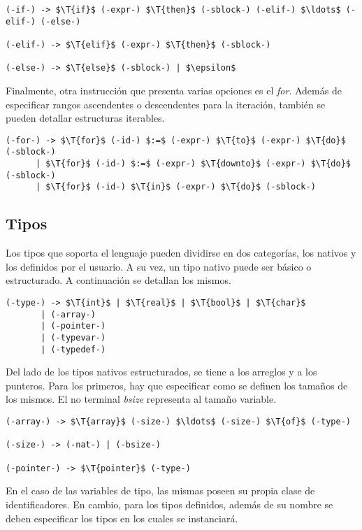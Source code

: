 \documentclass{article}
\begin{document}
\begin{lstlisting}[style = syntax]
(-if-) -> $\T{if}$ (-expr-) $\T{then}$ (-sblock-) (-elif-) $\ldots$ (-elif-) (-else-)

(-elif-) -> $\T{elif}$ (-expr-) $\T{then}$ (-sblock-)

(-else-) -> $\T{else}$ (-sblock-) | $\epsilon$ 
\end{lstlisting}

Finalmente, otra instrucción que presenta varias opciones es el \textit{for}.
Además de especificar rangos ascendentes o descendentes para la iteración, también se pueden detallar estructuras iterables.

\begin{lstlisting}[style = syntax]
(-for-) -> $\T{for}$ (-id-) $:=$ (-expr-) $\T{to}$ (-expr-) $\T{do}$ (-sblock-)
      | $\T{for}$ (-id-) $:=$ (-expr-) $\T{downto}$ (-expr-) $\T{do}$ (-sblock-)
      | $\T{for}$ (-id-) $\T{in}$ (-expr-) $\T{do}$ (-sblock-)
\end{lstlisting}

\subsection{Tipos}

Los tipos que soporta el lenguaje pueden dividirse en dos categorías, los nativos y los definidos por el usuario.
A su vez, un tipo nativo puede ser básico o estructurado.
A continuación se detallan los mismos.

\begin{lstlisting}[style = syntax]
(-type-) -> $\T{int}$ | $\T{real}$ | $\T{bool}$ | $\T{char}$
       | (-array-)
       | (-pointer-)
       | (-typevar-)
       | (-typedef-)
\end{lstlisting}

Del lado de los tipos nativos estructurados, se tiene a los arreglos y a los punteros.
Para los primeros, hay que especificar como se definen los tamaños de los mismos.
El no terminal \textit{bsize} representa al tamaño variable.

\begin{lstlisting}[style = syntax]
(-array-) -> $\T{array}$ (-size-) $\ldots$ (-size-) $\T{of}$ (-type-)

(-size-) -> (-nat-) | (-bsize-)

(-pointer-) -> $\T{pointer}$ (-type-)
\end{lstlisting}

En el caso de las variables de tipo, las mismas poseen su propia clase de identificadores.
En cambio, para los tipos definidos, además de su nombre se deben especificar los tipos en los cuales se instanciará.
\end{document}
